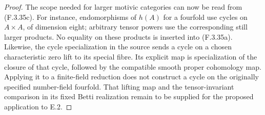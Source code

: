 \begin{proof}
The scope needed for larger motivic categories can now be read from
(F.3.35c). For instance, endomorphisms of \(h(A)\) for a fourfold
use cycles on \(A\times A\), of dimension eight; arbitrary tensor
powers use the corresponding still larger products. No equality
on these products is inserted into (F.3.35a). Likewise, the cycle
specialization in the source sends a cycle on a chosen characteristic
zero lift to its special fibre. Its explicit map is specialization
of the closure of that cycle, followed by the compatible smooth
proper cohomology map. Applying it to a finite-field reduction
does not construct a cycle on the originally specified number-field
fourfold. That lifting map and the tensor-invariant comparison in
its fixed Betti realization remain to be supplied for the proposed
application to E.2.
\end{proof}


